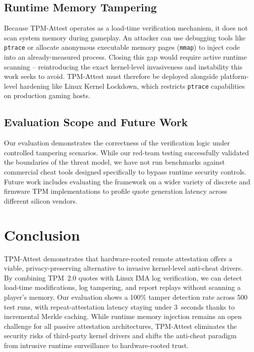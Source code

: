 \documentclass[11pt]{article}
\begin{document}
\subsection{Runtime Memory Tampering}
Because TPM-Attest operates as a load-time verification mechanism, it does not scan system memory during gameplay. An attacker can use debugging tools like \texttt{ptrace} or allocate anonymous executable memory pages (\texttt{mmap}) to inject code into an already-measured process. Closing this gap would require active runtime scanning -- reintroducing the exact kernel-level invasiveness and instability this work seeks to avoid. TPM-Attest must therefore be deployed alongside platform-level hardening like Linux Kernel Lockdown, which restricts \texttt{ptrace} capabilities on production gaming hosts.

\subsection{Evaluation Scope and Future Work}
Our evaluation demonstrates the correctness of the verification logic under controlled tampering scenarios. While our red-team testing successfully validated the boundaries of the threat model, we have not run benchmarks against commercial cheat tools designed specifically to bypass runtime security controls. Future work includes evaluating the framework on a wider variety of discrete and firmware TPM implementations to profile quote generation latency across different silicon vendors.

\section{Conclusion}

TPM-Attest demonstrates that hardware-rooted remote attestation offers a viable, privacy-preserving alternative to invasive kernel-level anti-cheat drivers. By combining TPM~2.0 quotes with Linux IMA log verification, we can detect load-time modifications, log tampering, and report replays without scanning a player's memory. Our evaluation shows a 100\% tamper detection rate across 500 test runs, with repeat-attestation latency staying under 3~seconds thanks to incremental Merkle caching. While runtime memory injection remains an open challenge for all passive attestation architectures, TPM-Attest eliminates the security risks of third-party kernel drivers and shifts the anti-cheat paradigm from intrusive runtime surveillance to hardware-rooted trust.
\end{document}
